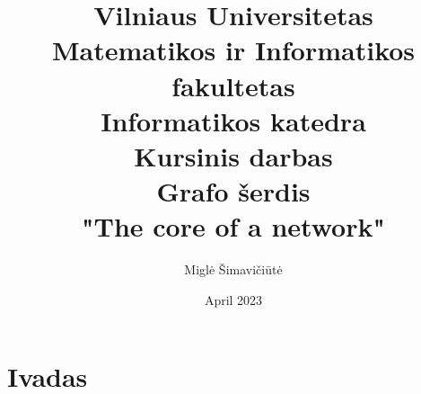 \documentclass{article}
\title{Vilniaus Universitetas \\ Matematikos ir Informatikos fakultetas \\ Informatikos katedra \\ Kursinis darbas \\ Grafo šerdis \\ "The core of a network"}
\author{Miglė Šimavičiūtė}
\date{April 2023}
\begin{document}
\maketitle
\newpage
\section{Ivadas}
\end{document}
